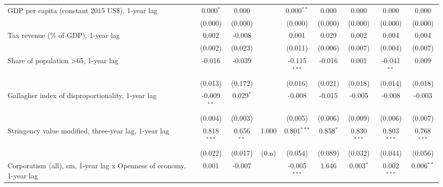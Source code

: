 \begin{table}[htbp]
\begin{tabular}{lcccccccc}
      GDP per capita (constant 2015 US\$), 1-year lag                     & 0.000$^{*}$   & 0.000                     &              & 0.000$^{**}$   & 0.000            & 0.000           & 0.000           & 0.000\\   
                                                                          & (0.000)       & (0.000)                   &              & (0.000)        & (0.000)          & (0.000)         & (0.000)         & (0.000)\\   
      Tax revenue (\% of GDP), 1-year lag                                 & 0.002         & -0.008                    &              & 0.001          & 0.029            & 0.002           & 0.004           & 0.004\\   
                                                                          & (0.002)       & (0.023)                   &              & (0.011)        & (0.006)          & (0.007)         & (0.004)         & (0.007)\\   
      Share of population >65, 1-year lag                                 & -0.016        & -0.039                    &              & -0.115$^{***}$ & -0.016           & 0.001           & -0.041$^{**}$   & 0.009\\   
                                                                          & (0.013)       & (0.172)                   &              & (0.016)        & (0.021)          & (0.018)         & (0.014)         & (0.018)\\   
      Gallagher index of disproportionality, 1-year lag                   & -0.009$^{**}$ & 0.029$^{*}$               &              & -0.008         & -0.015           & -0.005          & -0.008          & -0.003\\   
                                                                          & (0.004)       & (0.003)                   &              & (0.005)        & (0.006)          & (0.009)         & (0.006)         & (0.007)\\   
      Stringency value modified, three-year lag, 1-year lag               & 0.818$^{***}$ & 0.656$^{**}$              & 1.000        & 0.801$^{***}$  & 0.858$^{*}$      & 0.830$^{***}$   & 0.803$^{***}$   & 0.768$^{***}$\\   
                                                                          & (0.022)       & (0.017)                   & (0.n)        & (0.054)        & (0.089)          & (0.032)         & (0.044)         & (0.056)\\   
      Corporatism (all), sm, 1-year lag x Openness of economy, 1-year lag & 0.001         & -0.007                    &              & -0.005$^{***}$ & 1.646            & 0.003$^{*}$     & 0.002$^{***}$   & 0.006$^{**}$\\   

\end{tabular}
\end{table}
